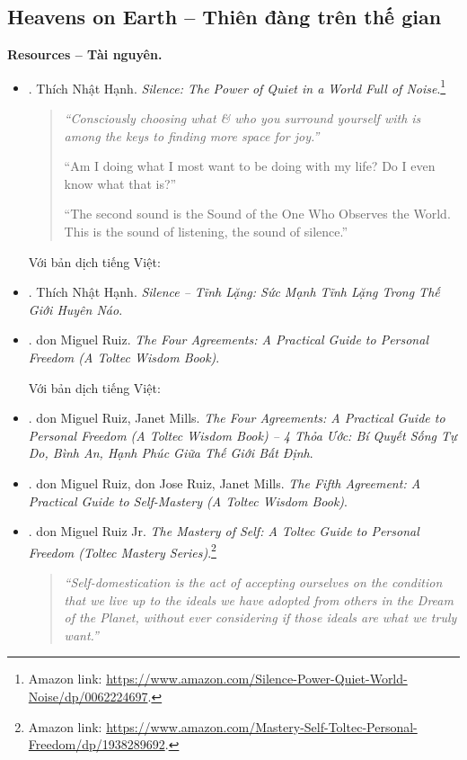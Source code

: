 \documentclass[12pt]{article}
\begin{document}
\subsection{Heavens on Earth -- Thiên đàng trên thế gian}
\textbf{\textsf{Resources -- Tài nguyên.}}
\begin{itemize}
	\item \cite{Hanh_silence}. {\sc Thích Nhật Hạnh}. {\it Silence: The Power of Quiet in a World Full of Noise}.\footnote{Amazon link: \url{https://www.amazon.com/Silence-Power-Quiet-World-Noise/dp/0062224697}.}	
	\begin{quotation}\it
		``Consciously choosing what \& who you surround yourself with is among the keys to finding more space for joy.''
		
		``Am I doing what I most want to be doing with my life? Do I even know what that is?''
		
		``The second sound is the Sound of the One Who Observes the World. This is the sound of listening, the sound of silence.''
	\end{quotation}
	Với bản dịch tiếng Việt:
	\item \cite{Hanh_silence_VN}. {\sc Thích Nhật Hạnh}. {\it Silence -- Tĩnh Lặng: Sức Mạnh Tĩnh Lặng Trong Thế Giới Huyên Náo}.
	\item \cite{Ruiz_4_agreements}. {\sc don Miguel Ruiz}. {\it The Four Agreements: A Practical Guide to Personal Freedom (A Toltec Wisdom Book)}.
	
	Với bản dịch tiếng Việt:
	\item \cite{Ruiz_Mills_4_agreements_VN}. {\sc don Miguel Ruiz, Janet Mills}. {\it The Four Agreements: A Practical Guide to Personal Freedom (A Toltec Wisdom Book) -- 4 Thỏa Ước: Bí Quyết Sống Tự Do, Bình An, Hạnh Phúc Giữa Thế Giới Bất Định}.
	\item \cite{Ruiz_Ruiz_5th_agreement}. {\sc don Miguel Ruiz, don Jose Ruiz, Janet Mills}. {\it The Fifth Agreement: A Practical Guide to Self-Mastery (A Toltec Wisdom Book)}.
	\item \cite{Ruiz_mastery_self}. {\sc don Miguel Ruiz Jr.} {\it The Mastery of Self: A Toltec Guide to Personal Freedom (Toltec Mastery Series)}.\footnote{Amazon link: \url{https://www.amazon.com/Mastery-Self-Toltec-Personal-Freedom/dp/1938289692}.}
	\begin{quotation}\it
		``Self-domestication is the act of accepting ourselves on the condition that we live up to the ideals we have adopted from others in the Dream of the Planet, without ever considering if those ideals are what we truly want.''
		

\end{quotation}
\end{itemize}
\end{document}
